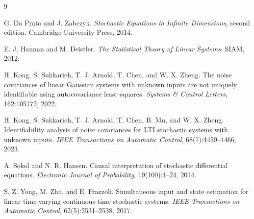 \documentclass[11pt]{article}
\theoremstyle{remark}
\begin{document}
\begin{thebibliography}{9}

G. Da Prato and J. Zabczyk.
\newblock \emph{Stochastic Equations in Infinite Dimensions}, second edition.
\newblock Cambridge University Press, 2014.

E. J. Hannan and M. Deistler.
\newblock \emph{The Statistical Theory of Linear Systems}.
\newblock SIAM, 2012.

H. Kong, S. Sukkarieh, T. J. Arnold, T. Chen, and W. X. Zheng.
\newblock The noise covariances of linear Gaussian systems with unknown inputs are not uniquely identifiable using autocovariance least-squares.
\newblock \emph{Systems \& Control Letters}, 162:105172, 2022.

H. Kong, S. Sukkarieh, T. J. Arnold, T. Chen, B. Mu, and W. X. Zheng.
\newblock Identifiability analysis of noise covariances for LTI stochastic systems with unknown inputs.
\newblock \emph{IEEE Transactions on Automatic Control}, 68(7):4459--4466, 2023.

A. Sokol and N. R. Hansen.
\newblock Causal interpretation of stochastic differential equations.
\newblock \emph{Electronic Journal of Probability}, 19(100):1--24, 2014.

S. Z. Yong, M. Zhu, and E. Frazzoli.
\newblock Simultaneous input and state estimation for linear time-varying continuous-time stochastic systems.
\newblock \emph{IEEE Transactions on Automatic Control}, 62(5):2531--2538, 2017.

\end{thebibliography}
\end{document}
